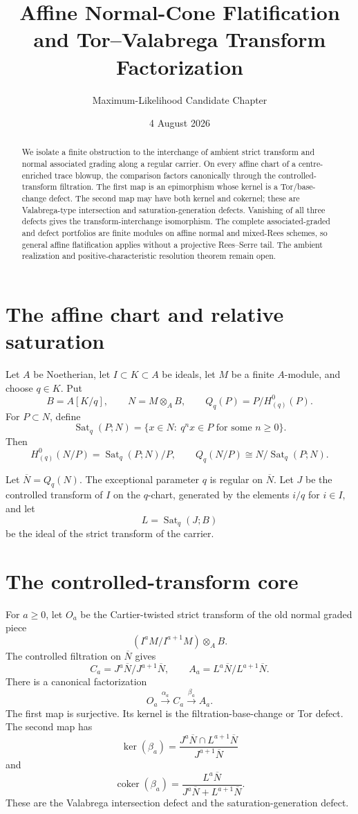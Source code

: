 \documentclass[11pt]{amsart}
\title{Affine Normal-Cone Flatification and Tor--Valabrega Transform Factorization}
\author{Maximum-Likelihood Candidate Chapter}
\date{4 August 2026}
\begin{document}
\maketitle

\begin{abstract}
We isolate a finite obstruction to the interchange of ambient strict transform
and normal associated grading along a regular carrier.  On every affine chart
of a centre-enriched trace blowup, the comparison factors canonically through
the controlled-transform filtration.  The first map is an epimorphism whose
kernel is a Tor/base-change defect.  The second map may have both kernel and
cokernel; these are Valabrega-type intersection and saturation-generation
defects.  Vanishing of all three defects gives the transform-interchange
isomorphism.  The complete associated-graded and defect portfolios are finite
modules on affine normal and mixed-Rees schemes, so general affine
flatification applies without a projective Rees--Serre tail.  The ambient
realization and positive-characteristic resolution theorem remain open.
\end{abstract}

\section{The affine chart and relative saturation}
Let $A$ be Noetherian, let $I\subset K\subset A$ be ideals, let $M$ be a
finite $A$-module, and choose $q\in K$.  Put
\[
 B=A[K/q],\qquad N=M\otimes_A B,
 \qquad Q_q(P)=P/H^0_{(q)}(P).
\]
For $P\subset N$, define
\[
 \operatorname{Sat}_q(P;N)=
 \{x\in N:\ q^n x\in P\text{ for some }n\geq0\}.
\]
Then
\[
 H^0_{(q)}(N/P)=\operatorname{Sat}_q(P;N)/P,
 \qquad
 Q_q(N/P)\cong N/\operatorname{Sat}_q(P;N).
\]

Let $\overline N=Q_q(N)$.  The exceptional parameter $q$ is regular on
$\overline N$.  Let $J$ be the controlled transform of $I$ on the $q$-chart,
generated by the elements $i/q$ for $i\in I$, and let
\[
 L=\operatorname{Sat}_q(J;B)
\]
be the ideal of the strict transform of the carrier.

\section{The controlled-transform core}
For $a\geq0$, let $O_a$ be the Cartier-twisted strict transform of the old
normal graded piece
\[
 (I^aM/I^{a+1}M)\otimes_A B.
\]
The controlled filtration on $\overline N$ gives
\[
 C_a=J^a\overline N/J^{a+1}\overline N,
 \qquad
 A_a=L^a\overline N/L^{a+1}\overline N.
\]
There is a canonical factorization
\[
 O_a\xrightarrow{\alpha_a}C_a\xrightarrow{\beta_a}A_a.
\]
The first map is surjective.  Its kernel is the filtration-base-change or Tor
defect.  The second map has
\[
 \ker(\beta_a)=
 \frac{J^a\overline N\cap L^{a+1}\overline N}
      {J^{a+1}\overline N}
\]
and
\[
 \operatorname{coker}(\beta_a)=
 \frac{L^a\overline N}
      {J^a\overline N+L^{a+1}\overline N}.
\]
These are the Valabrega intersection defect and the saturation-generation
defect.
\end{document}
